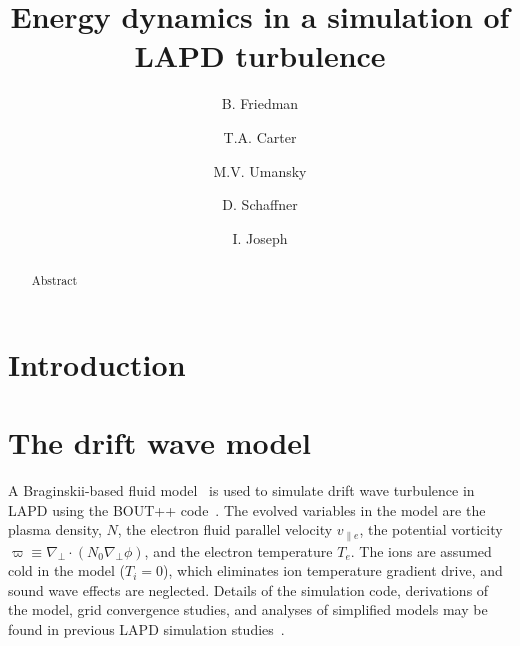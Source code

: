 \documentclass[showpacs,preprintnumbers,amsmath,amssymb,superscriptaddress,aip]{revtex4-1}
\def\grad{\nabla}
\newcommand{\gradperp}{\grad_\perp}
\newcommand{\vpe}{v_{\parallel e}}
\begin{document}
\title{Energy dynamics in a simulation of LAPD turbulence}

\author{B. Friedman}

\author{T.A. Carter}


\author{M.V. Umansky}

\author{D. Schaffner}


\author{I. Joseph}





\begin{abstract}
Abstract
\end{abstract}

\maketitle

\section{Introduction}


\section{The drift wave model}
\label{dw_model}

A Braginskii-based fluid model~\cite{Braginskii1965} is used to simulate drift wave turbulence in LAPD using the BOUT++ code~\cite{dudson2009}. 
The evolved variables in the model are the plasma density, $N$, the electron fluid parallel velocity $\vpe$, the potential vorticity $\varpi \equiv \gradperp \cdot (N_0 \gradperp \phi)$,
and the electron temperature $T_e$. The ions are assumed cold in the
model ($T_i = 0$), which eliminates ion temperature gradient drive,
and sound wave effects are neglected. Details of the simulation code, derivations of the model, grid convergence studies, and analyses of simplified models
may be found in previous LAPD simulation studies~\cite{Popovich2010a,Popovich2010b,Umansky2011,friedman2012,friedman2012b}.
\end{document}
